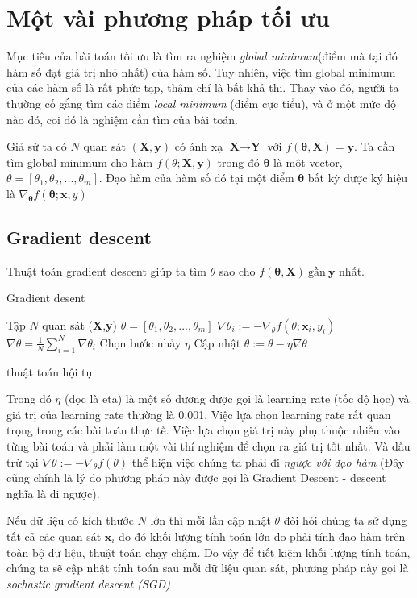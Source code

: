 \section{Một vài phương pháp tối ưu}
Mục tiêu của bài toán tối ưu là tìm ra nghiệm \textit{global minimum}(điểm mà tại đó hàm số đạt giá trị nhỏ nhất) của hàm số.  Tuy nhiên, việc tìm global minimum của các hàm số là rất phức tạp, thậm chí là bất khả thi. Thay vào đó, người ta thường cố gắng tìm các điểm \textit{local minimum} (điểm cực tiểu), và ở một mức độ nào đó, coi đó là nghiệm cần tìm của bài toán.\par
Giả sử ta có $N$ quan sát $(\textbf{X},\textbf{y})$ có ánh xạ $\textbf{X} \to \textbf{Y}$ với $f(\mathbf{\theta},\textbf{X})=\textbf{y}$. Ta cần tìm global minimum cho hàm $f(\theta;\textbf{X},\textbf{y})$ trong đó $\mathbf{\theta}$ là một vector, $\theta=[\theta_1,\theta_2,...,\theta_m]$. Đạo hàm của hàm số đó tại một điểm   $\mathbf{\theta}$ bất kỳ được ký hiệu là $\nabla_\mathbf{\theta} f(\mathbf{\theta};\textbf{x},y)$
\subsection{Gradient descent}
Thuật toán gradient descent giúp ta tìm $\theta$ sao cho $f(\mathbf{\theta},\textbf{X})~\text{gần}~\textbf{y}$ nhất.
\begin{algorithm}[H]
\label{alg:grad}
\caption{Gradient desent}
\begin{algorithmic}[1]
\REQUIRE Tập $N$ quan sát (\textbf{X},\textbf{y})
\REQUIRE $\theta=[\theta_1,\theta_2,...,\theta_m]$
\REPEAT 
{}
\STATE $\nabla \theta_i := - \nabla_{\theta}f(\theta;\textbf{x}_i,y_i)$
\ENDFOR
\STATE $\nabla \theta  =\frac{1}{N} \sum^{N}_{i=1}\nabla\theta_i$
\STATE Chọn bước nhảy $\eta$
\STATE Cập nhật $\theta := \theta - \eta\nabla\theta$

\UNTIL	thuật toán hội tụ
\end{algorithmic}
\end{algorithm}
Trong đó $\eta$ (đọc là eta) là một số dương được gọi là learning rate (tốc độ học) và giá trị của learning rate thường là 0.001. Việc lựa chọn learning rate rất quan trọng trong các bài toán thực tế. Việc lựa chọn giá trị này phụ thuộc nhiều vào từng bài toán và phải làm một vài thí nghiệm để chọn ra giá trị tốt nhất. Và dấu trừ tại $\nabla \theta := - \nabla_{\theta}f(\theta)$ thể hiện việc chúng ta phải đi\textit{ ngược với đạo hàm} (Đây cũng chính là lý do phương pháp này được gọi là Gradient Descent - descent nghĩa là đi ngược).\par
Nếu dữ liệu có kích thước $N$ lớn thì mỗi lần cập nhật $\theta$ đòi hỏi chúng ta sử dụng tất cả các quan sát $\textbf{x}_i$ do đó khối lượng tính toán lớn do phải tính đạo hàm trên toàn bộ dữ liệu, thuật toán chạy chậm. Do vậy để tiết kiệm khối lượng tính toán, chúng ta sẽ cập nhật tính toán sau mỗi dữ liệu quan sát, phương pháp này gọi là \textit{sochastic gradient descent (SGD)}

